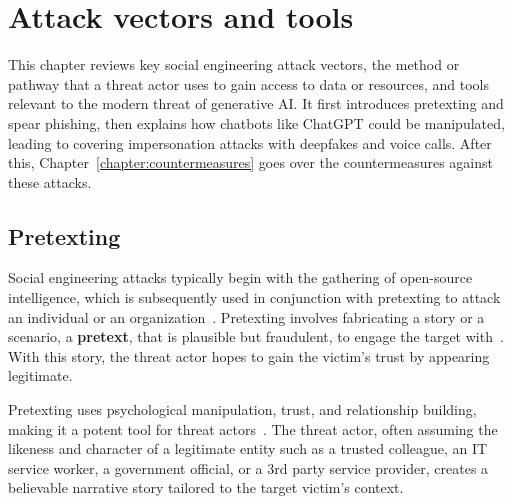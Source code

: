 

\chapter{Attack vectors and tools\label{chapter:attacks}}
\begin{comment}
\end{comment}

This chapter reviews key social engineering attack vectors, the method or pathway that a threat actor uses to gain access to data or resources, and tools relevant to the modern threat of generative AI. It first introduces pretexting and spear phishing, then explains how chatbots like ChatGPT could be manipulated, leading to covering impersonation attacks with deepfakes and voice calls. After this, Chapter~\ref{chapter:countermeasures} goes over the countermeasures against these attacks.



\section{Pretexting}
\begin{comment}
\end{comment}

%
%
Social engineering attacks typically begin with the gathering of open-source intelligence, which is subsequently used in conjunction with pretexting to attack an individual or an organization~\citep{hadnagy_Social_Engineering_The_Science_2018}. Pretexting involves fabricating a story or a scenario, a \textbf{pretext}, that is plausible but fraudulent, to engage the target with~\citep{wang_Defining_Social_Engineering_2020}. With this story, the threat actor hopes to gain the victim's trust by appearing legitimate. 

%
%
Pretexting uses psychological manipulation, trust, and relationship building, making it a potent tool for threat actors~\citep{mitnick_The_Art_of_Deception_2003}. The threat actor, often assuming the likeness and character of a legitimate entity such as a trusted colleague, an IT service worker, a government official, or a 3rd party service provider, creates a believable narrative story tailored to the target victim's context.

%
%







